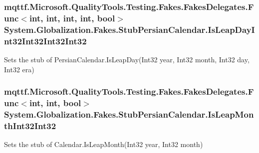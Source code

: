 \hypertarget{class_system_1_1_globalization_1_1_fakes_1_1_stub_persian_calendar_a68004e52978ae4cfe26b5be004e2e14f}{
\subsubsection[{Is\-Leap\-Day\-Int32\-Int32\-Int32\-Int32}]{\setlength{\rightskip}{0pt plus 5cm}mqttf.\-Microsoft.\-Quality\-Tools.\-Testing.\-Fakes.\-Fakes\-Delegates.\-Func$<$int, int, int, int, bool$>$ System.\-Globalization.\-Fakes.\-Stub\-Persian\-Calendar.\-Is\-Leap\-Day\-Int32\-Int32\-Int32\-Int32}}\label{class_system_1_1_globalization_1_1_fakes_1_1_stub_persian_calendar_a68004e52978ae4cfe26b5be004e2e14f}


Sets the stub of Persian\-Calendar.\-Is\-Leap\-Day(\-Int32 year, Int32 month, Int32 day, Int32 era)

\hypertarget{class_system_1_1_globalization_1_1_fakes_1_1_stub_persian_calendar_ab1880c346e5f18075bf8aff29b21cd6c}{
\subsubsection[{Is\-Leap\-Month\-Int32\-Int32}]{\setlength{\rightskip}{0pt plus 5cm}mqttf.\-Microsoft.\-Quality\-Tools.\-Testing.\-Fakes.\-Fakes\-Delegates.\-Func$<$int, int, bool$>$ System.\-Globalization.\-Fakes.\-Stub\-Persian\-Calendar.\-Is\-Leap\-Month\-Int32\-Int32}}\label{class_system_1_1_globalization_1_1_fakes_1_1_stub_persian_calendar_ab1880c346e5f18075bf8aff29b21cd6c}


Sets the stub of Calendar.\-Is\-Leap\-Month(\-Int32 year, Int32 month)

